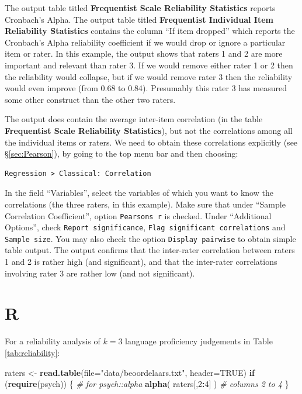 \documentclass[
]{book}
\newenvironment{Shaded}{\begin{snugshade}}{\end{snugshade}}
\newcommand{\AttributeTok}[1]{\textcolor[rgb]{0.13,0.29,0.53}{#1}}
\newcommand{\CommentTok}[1]{\textcolor[rgb]{0.56,0.35,0.01}{\textit{#1}}}
\newcommand{\ConstantTok}[1]{\textcolor[rgb]{0.56,0.35,0.01}{#1}}
\newcommand{\ControlFlowTok}[1]{\textcolor[rgb]{0.13,0.29,0.53}{\textbf{#1}}}
\newcommand{\DecValTok}[1]{\textcolor[rgb]{0.00,0.00,0.81}{#1}}
\newcommand{\FunctionTok}[1]{\textcolor[rgb]{0.13,0.29,0.53}{\textbf{#1}}}
\newcommand{\NormalTok}[1]{#1}
\newcommand{\OtherTok}[1]{\textcolor[rgb]{0.56,0.35,0.01}{#1}}
\newcommand{\SpecialCharTok}[1]{\textcolor[rgb]{0.81,0.36,0.00}{\textbf{#1}}}
\newcommand{\StringTok}[1]{\textcolor[rgb]{0.31,0.60,0.02}{#1}}
\begin{document}
The output table titled \textbf{Frequentist Scale Reliability Statistics} reports Cronbach's Alpha.
The output table titled \textbf{Frequentist Individual Item Reliability Statistics} contains the column ``If item dropped'' which reports the Cronbach's Alpha reliability coefficient if we would drop or ignore a particular item or rater. In this example, the output shows that raters 1 and 2 are more important and relevant than rater 3. If we would remove either rater 1 or 2 then the reliability would collapse, but if we would remove rater 3 then the reliability would even improve (from 0.68 to 0.84). Presumably this rater 3 has measured some other construct than the other two raters.

The output does contain the average inter-item correlation (in the table \textbf{Frequentist Scale Reliability Statistics}), but not the correlations among all the individual items or raters.
We need to obtain these correlations explicitly (see §\ref{sec:Pearson}), by going to the top menu bar and then choosing:

\begin{verbatim}
Regression > Classical: Correlation
\end{verbatim}

In the field ``Variables'', select the variables of which you want to know the correlations (the three raters, in this example).
Make sure that under ``Sample Correlation Coefficient'', option \texttt{Pearson\textquotesingle{}s\ r} is checked.
Under ``Additional Options'', check \texttt{Report\ significance}, \texttt{Flag\ significant\ correlations} and \texttt{Sample\ size}. You may also check the option \texttt{Display\ pairwise} to obtain simple table output. The output confirms that the inter-rater correlation between raters 1 and 2 is rather high (and significant), and that the inter-rater correlations involving rater 3 are rather low (and not significant).

\section{R}\label{r-11}

For a reliability analysis of \(k=3\) language proficiency
judgements in Table \ref{tab:reliability}:\\

\begin{Shaded}
\begin{Highlighting}[]
\NormalTok{raters }\OtherTok{\textless{}{-}} \FunctionTok{read.table}\NormalTok{(}\AttributeTok{file=}\StringTok{"data/beoordelaars.txt"}\NormalTok{, }\AttributeTok{header=}\ConstantTok{TRUE}\NormalTok{)}
\ControlFlowTok{if}\NormalTok{ (}\FunctionTok{require}\NormalTok{(psych)) \{ }\CommentTok{\# for psych::alpha}
  \FunctionTok{alpha}\NormalTok{( raters[,}\DecValTok{2}\SpecialCharTok{:}\DecValTok{4}\NormalTok{] ) }\CommentTok{\# columns 2 to 4}
\NormalTok{\}}
\end{Highlighting}
\end{Shaded}
\end{document}
